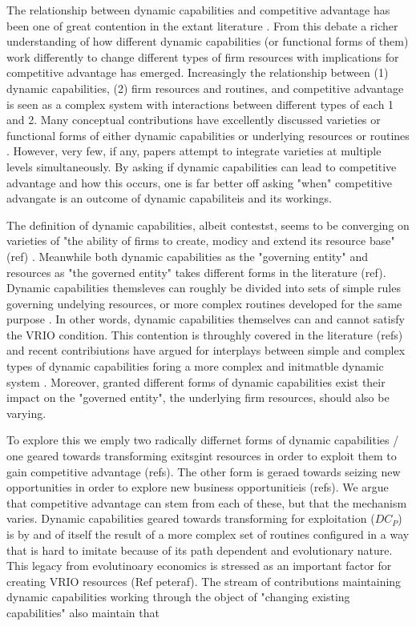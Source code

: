 \documentclass[review,fleqn]{elsarticle}\usepackage[]{graphicx}\usepackage[]{color}
\begin{document}
The relationship between dynamic capabilities and competitive advantage has been one of
great contention in the extant literature \citep{Peteraf2013,Ambrosini2009}. From this
debate a richer understanding of how different dynamic capabilities (or functional forms
of them) work differently to change different types of firm resources
\citep{Helfat2015a,Teece2007,Ambrosini2009a} with implications for competitive advantage
\citep{Peteraf2013} has emerged. Increasingly the relationship between (1) dynamic
capabilities, (2) firm resources and routines, and competitive advantage is seen as a
complex system with interactions between different types of each 1 and 2. Many conceptual
contributions have excellently discussed varieties or functional forms of either dynamic
capabilities \citep{Ambrosini2009a,Helfat2015ad,DiStefano2014} or underlying resources or
routines \citep{Winter2003,Eisenhardt2000}. However, very few, if any, papers attempt to
integrate varieties at multiple levels simultaneously. By asking if dynamic capabilities
can lead to competitive advantage and how this occurs, one is far better off asking "when"
competitive advangate is an outcome of dynamic capabiliteis and its workings. 

The definition of dynamic capabilities, albeit contestst, seems to be converging on
varieties of "the ability of firms to create, modicy and extend its resource base" (ref)
\citep{Schilke2018}. Meanwhile both dynamic capabilities as the "governing entity" and
resources as "the governed entity" takes different forms in the literature (ref). Dynamic
capabilities themsleves can roughly be divided into sets of simple rules governing
undelying resources, or more complex routines developed for the same purpose
\citep{Peteraf2013}. In other words, dynamic capabilities themselves can and cannot satisfy
the VRIO condition. This contention is throughly covered in the literature (refs) and
recent contribiutions have argued for interplays between simple and complex types of
dynamic capabilities foring a more complex and initmatble dynamic system
\citep{DiStefano2014}. Moreover, granted different forms of dynamic capabilities exist
their impact on the "governed entity", the underlying firm resources, should also be
varying. 

To explore this we emply two radically differnet forms of dynamic capabilities / one
geared towards transforming exitsgint resources in order to exploit them to gain
competitive advantage (refs). The other form is geraed towards seizing new opportunities in order
to explore new business opportunitieis (refs). We argue that competitive advantage can
stem from each of these, but that the mechanism varies. Dynamic capabilities geared
towards transforming for exploitation ($DC_P$) is by and of itself the result of a more
complex set of routines configured in a way that is hard to imitate because of its path
dependent and evolutionary nature. This legacy from evolutinoary economics is stressed as
an important factor for creating VRIO resources (Ref peteraf). The stream of contributions
maintaining dynamic capabilities working through the object of "changing existing
capabilities" \citep{Teece1997,Zollo2002a,Winter2003,Zahra2006,Kale2002} also maintain
that 
\end{document}
